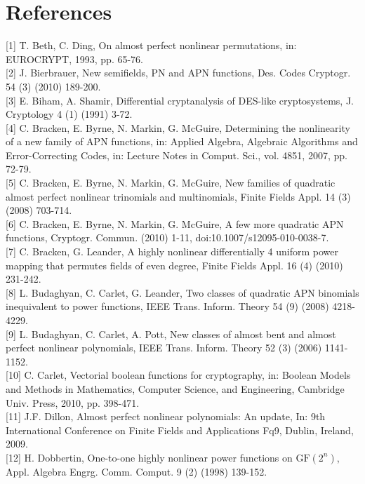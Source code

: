 \documentclass[10pt]{article}
\begin{document}
\section*{References}
[1] T. Beth, C. Ding, On almost perfect nonlinear permutations, in: EUROCRYPT, 1993, pp. 65-76.\\[0pt]
[2] J. Bierbrauer, New semifields, PN and APN functions, Des. Codes Cryptogr. 54 (3) (2010) 189-200.\\[0pt]
[3] E. Biham, A. Shamir, Differential cryptanalysis of DES-like cryptosystems, J. Cryptology 4 (1) (1991) 3-72.\\[0pt]
[4] C. Bracken, E. Byrne, N. Markin, G. McGuire, Determining the nonlinearity of a new family of APN functions, in: Applied Algebra, Algebraic Algorithms and Error-Correcting Codes, in: Lecture Notes in Comput. Sci., vol. 4851, 2007, pp. 72-79.\\[0pt]
[5] C. Bracken, E. Byrne, N. Markin, G. McGuire, New families of quadratic almost perfect nonlinear trinomials and multinomials, Finite Fields Appl. 14 (3) (2008) 703-714.\\[0pt]
[6] C. Bracken, E. Byrne, N. Markin, G. McGuire, A few more quadratic APN functions, Cryptogr. Commun. (2010) 1-11, doi:10.1007/s12095-010-0038-7.\\[0pt]
[7] C. Bracken, G. Leander, A highly nonlinear differentially 4 uniform power mapping that permutes fields of even degree, Finite Fields Appl. 16 (4) (2010) 231-242.\\[0pt]
[8] L. Budaghyan, C. Carlet, G. Leander, Two classes of quadratic APN binomials inequivalent to power functions, IEEE Trans. Inform. Theory 54 (9) (2008) 4218-4229.\\[0pt]
[9] L. Budaghyan, C. Carlet, A. Pott, New classes of almost bent and almost perfect nonlinear polynomials, IEEE Trans. Inform. Theory 52 (3) (2006) 1141-1152.\\[0pt]
[10] C. Carlet, Vectorial boolean functions for cryptography, in: Boolean Models and Methods in Mathematics, Computer Science, and Engineering, Cambridge Univ. Press, 2010, pp. 398-471.\\[0pt]
[11] J.F. Dillon, Almost perfect nonlinear polynomials: An update, In: 9th International Conference on Finite Fields and Applications Fq9, Dublin, Ireland, 2009.\\[0pt]
[12] H. Dobbertin, One-to-one highly nonlinear power functions on $\mathrm{GF}\left(2^{n}\right)$, Appl. Algebra Engrg. Comm. Comput. 9 (2) (1998) 139-152.\\[0pt]
\end{document}
